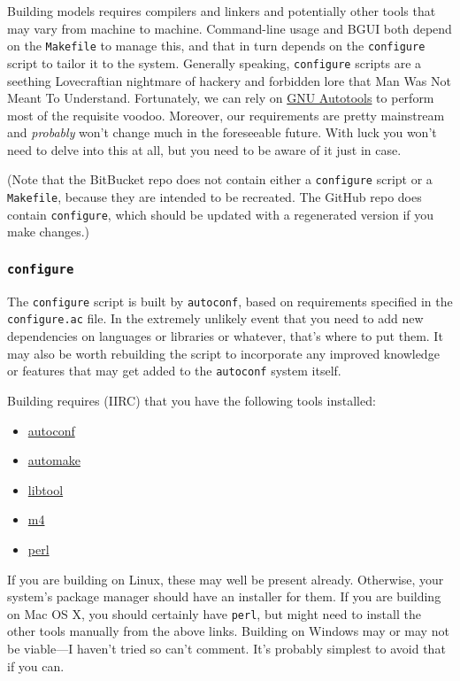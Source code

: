 \documentclass[a4paper,11pt]{article}
\begin{document}
Building models requires compilers and linkers and potentially other tools that may vary from machine to machine. Command-line usage and BGUI both depend on the \texttt{Makefile} to manage this, and that in turn depends on the \texttt{configure} script to tailor it to the system. Generally speaking, \texttt{configure} scripts are a seething Lovecraftian nightmare of hackery and forbidden lore that Man Was Not Meant To Understand. Fortunately, we can rely on \href{http://www.freesoftwaremagazine.com/articles/brief_introduction_to_gnu_autotools}{GNU Autotools} to perform most of the requisite voodoo. Moreover, our requirements are pretty mainstream and \textit{probably} won't  change much in the foreseeable future. With luck you won't need to delve into this at all, but you need to be aware of it just in case.

(Note that the BitBucket repo does not contain either a \texttt{configure} script or a \texttt{Makefile}, because they are intended to be recreated. The GitHub repo does contain \texttt{configure}, which should be updated with a regenerated version if you make changes.)

\subsubsection{\texttt{configure}}\label{autoconf}

The \texttt{configure} script is built by \texttt{autoconf}, based on requirements specified in the \texttt{configure.ac} file. In the extremely unlikely event that you need to add new dependencies on languages or libraries or whatever, that's where to put them. It may also be worth rebuilding the script to incorporate any improved knowledge or features that may get added to the \texttt{autoconf} system itself.

Building requires (IIRC) that you have the following tools installed:
\begin{itemize}
\item \href{http://www.gnu.org/software/autoconf/}{autoconf}
\item \href{https://www.gnu.org/software/automake/}{automake}
\item \href{https://www.gnu.org/software/libtool/}{libtool}
\item \href{http://www.gnu.org/software/m4/}{m4}
\item \href{https://www.perl.org}{perl}
\end{itemize}
If you are building on Linux, these may well be present already. Otherwise, your system's package manager should have an installer for them. If you are building on Mac OS X, you should certainly have \texttt{perl}, but might need to install the other tools manually from the above links. Building on Windows may or may not be viable---I haven't tried so can't comment. It's probably simplest to avoid that if you can.
\end{document}
